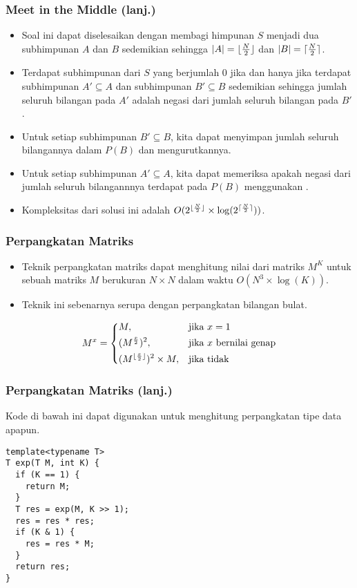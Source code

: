 \begin{frame}
\frametitle{Meet in the Middle (lanj.)}
\begin{itemize}
  \item Soal ini dapat diselesaikan dengan membagi himpunan $S$ menjadi dua subhimpunan $A$ dan $B$ sedemikian sehingga $|A| = \lfloor \frac{N}{2} \rfloor$ dan $|B| = \lceil \frac{N}{2} \rceil$.
  \item Terdapat subhimpunan dari $S$ yang berjumlah $0$ jika dan hanya jika terdapat subhimpunan $A' \subseteq A$ dan subhimpunan $B' \subseteq B$ sedemikian sehingga jumlah seluruh bilangan pada $A'$ adalah negasi dari jumlah seluruh bilangan pada $B'$.
  \item Untuk setiap subhimpunan $B' \subseteq B$, kita dapat menyimpan jumlah seluruh bilangannya dalam \farray $P(B)$ dan mengurutkannya.
  \item Untuk setiap subhimpunan $A' \subseteq A$, kita dapat memeriksa apakah negasi dari jumlah seluruh bilangannnya terdapat pada \farray$P(B)$ menggunakan \fbinarySearch.
  \item Kompleksitas dari solusi ini adalah $O(2^{\lfloor \frac{N}{2} \rfloor} \times \log(2^{\lceil \frac{N}{2} \rceil}))$.
\end{itemize}
\end{frame}

\begin{frame}
\frametitle{Perpangkatan Matriks}
\begin{itemize}
  \item Teknik perpangkatan matriks dapat menghitung nilai dari matriks $M^K$ untuk sebuah matriks $M$ berukuran $N \times N$ dalam waktu $O(N^3 \times \log(K))$.
  \item Teknik ini sebenarnya serupa dengan perpangkatan bilangan bulat.
\end{itemize}
\[
    M^x= 
\begin{dcases}
    M,                                    & \text{jika } x = 1\\
    (M^{\frac{x}{2}})^2,                  & \text{jika } x \text{ bernilai genap}\\
    (M^{\lfloor \frac{x}{2} \rfloor})^2 \times M, & \text{jika tidak}
\end{dcases}
\]
\end{frame}

\begin{frame}[fragile]
\frametitle{Perpangkatan Matriks (lanj.)}
Kode di bawah ini dapat digunakan untuk menghitung perpangkatan tipe data apapun.
\newline
\begin{lstlisting}
template<typename T>
T exp(T M, int K) {
  if (K == 1) {
    return M;
  }
  T res = exp(M, K >> 1);
  res = res * res;
  if (K & 1) {
    res = res * M;
  }
  return res;
}
\end{lstlisting}
\end{frame}

